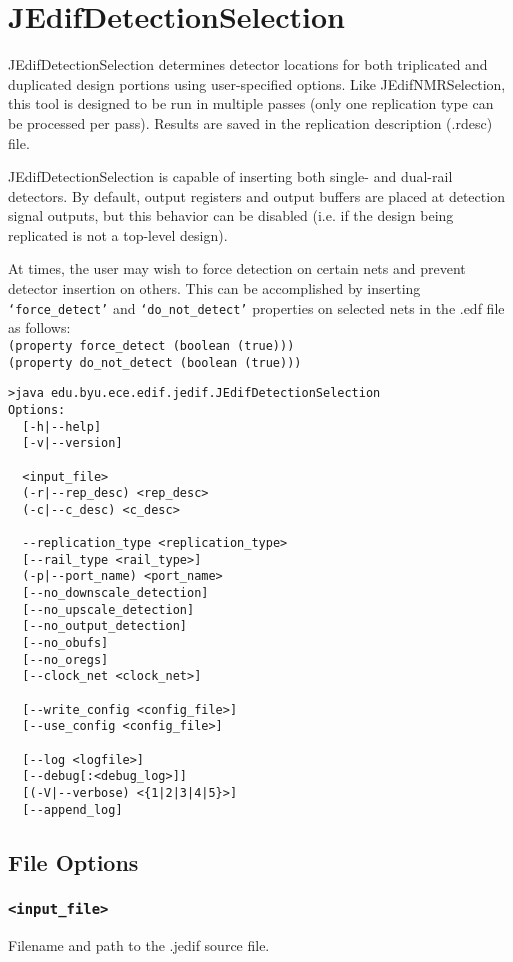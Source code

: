 \section{JEdifDetectionSelection}
JEdifDetectionSelection determines detector locations for both triplicated and
duplicated design portions using user-specified options. Like
JEdifNMRSelection, this tool is designed to be run in multiple passes
(only one replication type can be processed per pass). Results are
saved in the replication description (.rdesc) file.

JEdifDetectionSelection is capable of inserting both single- and dual-rail
detectors. By default, output registers and output buffers are placed at detection signal
outputs, but this behavior can be disabled (i.e. if the design being replicated
is not a top-level design).

At times, the user may wish to force detection on certain nets and prevent
detector insertion on others. This can be accomplished by inserting
\texttt{`force\_detect'} and \texttt{`do\_not\_detect'} properties on selected
nets in the .edf file as follows:\\
\texttt{(property force\_detect (boolean (true)))}\\
\texttt{(property do\_not\_detect (boolean (true)))}\\

\begin{verbatim}
>java edu.byu.ece.edif.jedif.JEdifDetectionSelection
Options:
  [-h|--help]
  [-v|--version]

  <input_file>
  (-r|--rep_desc) <rep_desc>
  (-c|--c_desc) <c_desc>

  --replication_type <replication_type>
  [--rail_type <rail_type>]
  (-p|--port_name) <port_name>
  [--no_downscale_detection]
  [--no_upscale_detection]
  [--no_output_detection]
  [--no_obufs]
  [--no_oregs]
  [--clock_net <clock_net>]
 
  [--write_config <config_file>]
  [--use_config <config_file>]

  [--log <logfile>]
  [--debug[:<debug_log>]]
  [(-V|--verbose) <{1|2|3|4|5}>]
  [--append_log]
\end{verbatim}
\subsection{File Options}

\subsubsection{\texttt{<input\_file>}}
Filename and path to the .jedif source file.

